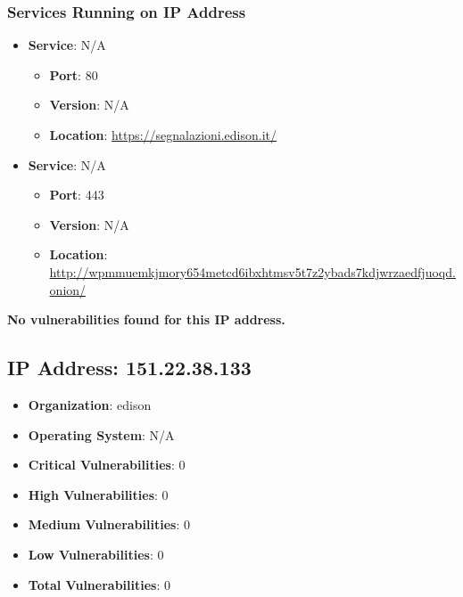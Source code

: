 \documentclass{article}
\begin{document}
\subsubsection*{Services Running on IP Address}

\begin{itemize}
    
        \item \textbf{Service}: N/A
        \begin{itemize}
            \item \textbf{Port}: 80
            \item \textbf{Version}:  N/A 
            \item \textbf{Location}: \href{ https://segnalazioni.edison.it/ }{ https://segnalazioni.edison.it/ }
        \end{itemize}
    
        \item \textbf{Service}: N/A
        \begin{itemize}
            \item \textbf{Port}: 443
            \item \textbf{Version}:  N/A 
            \item \textbf{Location}: \href{ http://wpmmuemkjmory654metcd6ibxhtmsv5t7z2ybads7kdjwrzaedfjuoqd.onion/ }{ http://wpmmuemkjmory654metcd6ibxhtmsv5t7z2ybads7kdjwrzaedfjuoqd.onion/ }
        \end{itemize}
    
\end{itemize}


\textbf{No vulnerabilities found for this IP address.}




\clearpage



\subsection*{IP Address: 151.22.38.133}

\begin{itemize}
    \item \textbf{Organization}: edison
    \item \textbf{Operating System}:  N/A 
    \item \textbf{Critical Vulnerabilities}: 0
    \item \textbf{High Vulnerabilities}: 0
    \item \textbf{Medium Vulnerabilities}: 0
    \item \textbf{Low Vulnerabilities}: 0
    \item \textbf{Total Vulnerabilities}: 0
\end{itemize}
\end{document}
